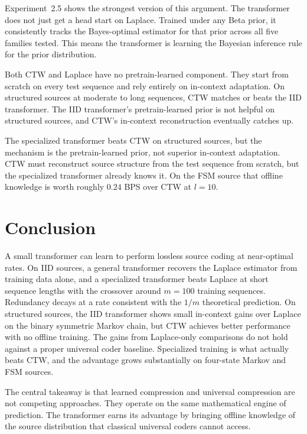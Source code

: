 \documentclass[onecolumn,english,12pt]{IEEEtran}
\theoremstyle{plain}
\theoremstyle{plain}
\theoremstyle{plain}
\theoremstyle{definition}
\begin{document}
Experiment~2.5 shows the strongest version of this argument. The transformer does not just get a head start on Laplace. Trained under any Beta prior, it consistently tracks the Bayes-optimal estimator for that prior across all five families tested. This means the transformer is learning the Bayesian inference rule for the prior distribution. 

Both CTW and Laplace have no pretrain-learned component. They start from scratch on every test sequence and rely entirely on in-context adaptation. On structured sources at moderate to long sequences, CTW matches or beats the IID transformer. The IID transformer's pretrain-learned prior is not helpful on structured sources, and CTW's in-context reconstruction eventually catches up.

The specialized transformer beats CTW on structured sources, but the mechanism is the pretrain-learned prior, not superior in-context adaptation. CTW must reconstruct source structure from the test sequence from scratch, but the specialized transformer already knows it. On the FSM source that offline knowledge is worth roughly $0.24$ BPS over CTW at $l=10$.

\section{Conclusion}
\label{sec:conclusion}

A small transformer can learn to perform lossless source coding at near-optimal
rates. On IID sources, a general transformer recovers the Laplace estimator
from training data alone, and a specialized transformer beats Laplace at short
sequence lengths with the crossover around $m=100$ training sequences.
Redundancy decays at a rate consistent with the $1/m$ theoretical prediction.
On structured sources, the IID transformer shows small in-context gains over
Laplace on the binary symmetric Markov chain, but CTW achieves
better performance with no offline training. The gains from Laplace-only
comparisons do not hold against a proper universal coder baseline. Specialized
training is what actually beats CTW, and the advantage grows substantially on
four-state Markov and FSM sources.

The central takeaway is that learned compression and universal compression
are not competing approaches. They operate on the same mathematical engine of prediction.
The transformer earns its advantage by bringing offline knowledge of the
source distribution that classical universal coders cannot access.



\end{document}
